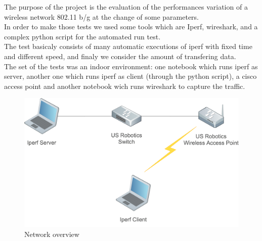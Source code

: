 
The purpose of the project 
is the evaluation of the performances variation of a wireless network 802.11 b/g at the change of some parameters.
\\\newline
In order to make those tests we used some tools which are Iperf, wireshark, and a complex python script for the automated run test.
\\\newline
The test basicaly consists of many automatic executions of iperf with fixed time and different speed, and finaly we consider the amount of transfering data.
\\\newline
The set of the tests was an indoor environment: one notebook which runs iperf as server, another one which runs iperf as client (through the python script), a cisco access point and another notebook wich runs wireshark to capture the traffic.

\vspace{1cm}

\begin{figure}[h!]
	\includegraphics[angle=0, keepaspectratio=true, width=15cm]{../images/network_overview}
	\caption{Network overview}
\end{figure}

